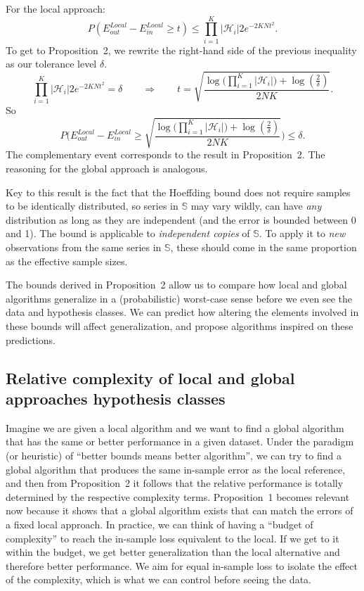 \documentclass[a4paper]{article}
\theoremstyle{custom}
\begin{document}
For the local approach:
$$
  P(E_{\textit{out}}^{\textit{Local}} - E_{\textit{in}}^{\textit{Local}} \geq t ) \leq \prod_{i=1}^K |\mathcal{H}_i | 2e^{-2KNt^2}.
$$
To get to Proposition~2, we rewrite the right-hand side of the previous inequality as our tolerance level $\delta$.
$$
  \prod_{i=1}^K |\mathcal{H}_i| 2e^{-2KNt^2} = \delta \qquad\Rightarrow\qquad t = \sqrt{ \frac{\log\big(\prod_{i=1}^K|\mathcal{H}_i|\big) + \log(\frac{2}{\delta})}{2NK}}.
$$
So
$$
  P \Bigg (E_{\textit{out}}^{\textit{Local}} - E_{\textit{in}}^{\textit{Local}} \geq \sqrt{ \frac{\log\big(\prod_{i=1}^K|\mathcal{H}_i|\big) + \log(\frac{2}{\delta})}{2NK}} \Bigg ) \leq \delta.
$$
The complementary event corresponds to the result in Proposition~2. The reasoning for the global approach is analogous.

Key to this result is the fact that the Hoeffding bound does not require samples to be identically distributed, so series in $\mathbb{S}$ may vary wildly, can have \textit{any} distribution as long as they are independent (and the error is bounded between 0 and 1). The bound is applicable to \textit{independent copies} of $\mathbb{S}$. To apply it to \textit{new} observations from the same series in $\mathbb{S}$, these should come in the same proportion as the effective sample sizes.

The bounds derived in Proposition~2 allow us to compare how local and global algorithms generalize in a (probabilistic) worst-case sense before we even see the data and hypothesis classes. We can predict how altering the elements involved in these bounds will affect generalization, and propose algorithms inspired on these predictions.

\subsection{Relative complexity of local and global approaches hypothesis classes}
\label{sec:altcomplex}

Imagine we are given a local algorithm and we want to find a global algorithm that has the same or better performance in a given dataset. Under the paradigm (or heuristic) of ``better bounds means better algorithm'', we can try to find a global algorithm that produces the same in-sample error as the local reference, and then from Proposition~2 it follows that the relative performance is totally determined by the respective complexity terms. Proposition~1 becomes relevant now because it shows that a global algorithm exists that can match the errors of a fixed local approach.
In practice, we can think of having a ``budget of complexity'' to reach the in-sample loss equivalent to the local. If we get to it within the budget, we get better generalization than the local alternative and therefore better performance. We aim for equal in-sample loss to isolate the effect of the complexity, which is what we can control before seeing the data.
\end{document}
